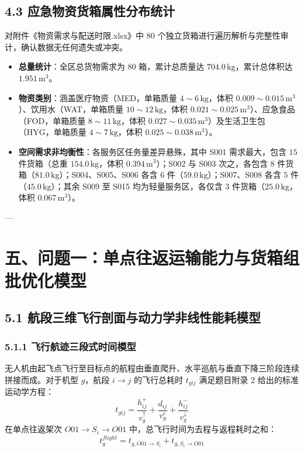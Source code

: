 \documentclass[12pt,a4paper,UTF8]{ctexart}
\begin{document}
\subsection{4.3 应急物资货箱属性分布统计}
对附件《物资需求与配送时限.xlsx》中 $80$ 个独立货箱进行遍历解析与完整性审计，确认数据无任何遗失或冲突。
\begin{itemize}[leftmargin=*]
    \item \textbf{总量统计}：全区总货物需求为 $80$ 箱，累计总质量达 $704.0\,\text{kg}$，累计总体积达 $1.951\,\text{m}^3$。
    \item \textbf{物资类别}：涵盖医疗物资（MED，单箱质量 $4\sim 6\,\text{kg}$，体积 $0.009\sim 0.015\,\text{m}^3$）、饮用水（WAT，单箱质量 $10\sim 12\,\text{kg}$，体积 $0.021\sim 0.025\,\text{m}^3$）、应急食品（FOD，单箱质量 $8\sim 11\,\text{kg}$，体积 $0.027\sim 0.035\,\text{m}^3$）及生活卫生包（HYG，单箱质量 $4\sim 7\,\text{kg}$，体积 $0.025\sim 0.038\,\text{m}^3$）。
    \item \textbf{空间需求非均衡性}：各服务区任务量差异悬殊，其中 S001 需求最大，包含 $15$ 件货箱（总重 $154.0\,\text{kg}$，体积 $0.394\,\text{m}^3$）；S002 与 S003 次之，各包含 $8$ 件货箱（$81.0\,\text{kg}$）；S004、S005、S006 各含 $6$ 件（$59.0\,\text{kg}$）；S007、S008 各含 $5$ 件（$45.0\,\text{kg}$）；其余 S009 至 S015 均为轻量服务区，各仅含 $3$ 件货箱（$25.0\,\text{kg}$，体积 $0.067\,\text{m}^3$）。
\end{itemize}

---

\section{五、问题一：单点往返运输能力与货箱组批优化模型}

\subsection{5.1 航段三维飞行剖面与动力学非线性能耗模型}

\subsubsection{5.1.1 飞行航迹三段式时间模型}
无人机由起飞点飞行至目标点的航程由垂直爬升、水平巡航与垂直下降三阶段连续拼接而成。对于机型 $g$，航段 $i \to j$ 的飞行总耗时 $t_{gij}$ 满足题目附录 2 给出的标准运动学方程：
\begin{equation}
t_{gij} = \frac{h_{ij}^+}{v_g^\uparrow} + \frac{d_{ij}}{v_g^c} + \frac{h_{ij}^-}{v_g^\downarrow}
\end{equation}
在单点往返架次 $O01 \to S_i \to O01$ 中，总飞行时间为去程与返程耗时之和：
\begin{equation}
t_g^{flight} = t_{g, O01 \to S_i} + t_{g, S_i \to O01}
\end{equation}
\end{document}
